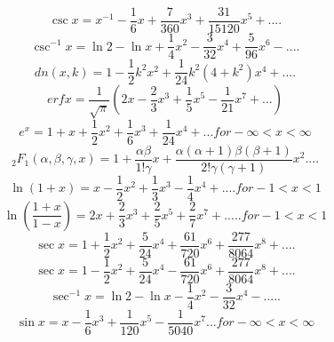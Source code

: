 \begin{equation}
\csc x = x^{-1} - \frac{1}{6} x + \frac{7}{360} x^3 + \frac{31}{15120} x^5 + ....
\end{equation}
\begin{equation}
\csc^{-1} x = \ln 2 - \ln x + \frac{1}{4} x^2 - \frac{3}{32} x^4 + \frac{5}{96} x^6 - ....
\end{equation}
\begin{equation}
dn(x,k) = 1 - \frac{1}{2} k^2 x^2 + \frac{1}{24} k^2 (4+k^2) x^4 + ....
\end{equation}
\begin{equation}
erf x = \frac{1}{\sqrt{\pi}} (2x - \frac{2}{3} x^3 + \frac{1}{5} x^5 - \frac{1}{21}x^7 + ...) 
\end{equation}
\begin{equation}
e^x = 1 + x + \frac{1}{2} x^2 + \frac{1}{6} x^3 + \frac{1}{24} x^4 + ... for - \infty < x < \infty 
\end{equation}
\begin{equation}
_{2}F_{1} (\alpha,\beta,\gamma,x) = 1 + \frac{\alpha\beta}{1!\gamma} x + \frac{\alpha(\alpha + 1)\beta(\beta + 1)}{2!\gamma(\gamma + 1)} x^2 ....
\end{equation}
\begin{equation}
\ln(1 + x) = x - \frac{1}{2} x^2 + \frac{1}{3} x^3 - \frac{1}{4} x^4 + ....for -1 < x < 1 
\end{equation}
\begin{equation}
\ln (\frac{1+x}{1-x}) = 2x + \frac{2}{3} x^3 + \frac{2}{5} x^5 + \frac{2}{7} x^7 + ..... for -1 < x < 1 
\end{equation}
\begin{equation}
\sec x = 1 + \frac{1}{2} x^2 + \frac{5}{24} x^4 + \frac{61}{720} x^6 + \frac{277}{8064} x^8 + ....
\end{equation}
\begin{equation}
\sec x = 1 - \frac{1}{2} x^2 + \frac{5}{24} x^4 - \frac{61}{720} x^6 + \frac{277}{8064} x^8 + ....
\end{equation}
\begin{equation}
\sec^{-1} x = \ln 2 - \ln x - \frac{1}{4} x^2 - \frac{3}{32} x^4 - .....
\end{equation}
\begin{equation}
\sin x = x - \frac{1}{6} x^3 + \frac{1}{120} x^5 - \frac{1}{5040} x^7 ... for - \infty < x < \infty 
\end{equation}
